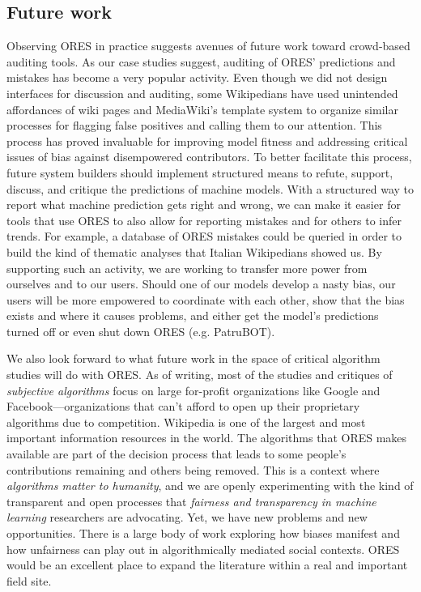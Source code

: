 \subsection{Future work}
Observing ORES in practice suggests avenues of future work toward crowd-based auditing tools.  As our case studies suggest, auditing of ORES' predictions and mistakes has become a very popular activity.  Even though we did not design interfaces for discussion and auditing, some Wikipedians have used unintended affordances of wiki pages and MediaWiki's template system to organize similar processes for flagging false positives and calling them to our attention.  This process has proved invaluable for improving model fitness and addressing critical issues of bias against disempowered contributors.  To better facilitate this process, future system builders should implement structured means to refute, support, discuss, and critique the predictions of machine models.  With a structured way to report what machine prediction gets right and wrong, we can make it easier for tools that use ORES to also allow for reporting mistakes and for others to infer trends.  For example, a database of ORES mistakes could be queried in order to build the kind of thematic analyses that Italian Wikipedians showed us.  By supporting such an activity, we are working to transfer more power from ourselves and to our users.  Should one of our models develop a nasty bias, our users will be more empowered to coordinate with each other, show that the bias exists and where it causes problems, and either get the model's predictions turned off or even shut down ORES (e.g. PatruBOT).

We also look forward to what future work in the space of critical algorithm studies will do with ORES.  As of writing, most of the studies and critiques of \emph{subjective algorithms}\cite{tufekci2015algorithms} focus on large for-profit organizations like Google and Facebook---organizations that can't afford to open up their proprietary algorithms due to competition.  Wikipedia is one of the largest and most important information resources in the world.  The algorithms that ORES makes available are part of the decision process that leads to some people's contributions remaining and others being removed.  This is a context where \emph{algorithms matter to humanity}, and we are openly experimenting with the kind of transparent and open processes that \emph{fairness and transparency in machine learning} researchers are advocating.  Yet, we have new problems and new opportunities.  There is a large body of work exploring how biases manifest and how unfairness can play out in algorithmically mediated social contexts.  ORES would be an excellent place to expand the literature within a real and important field site.

